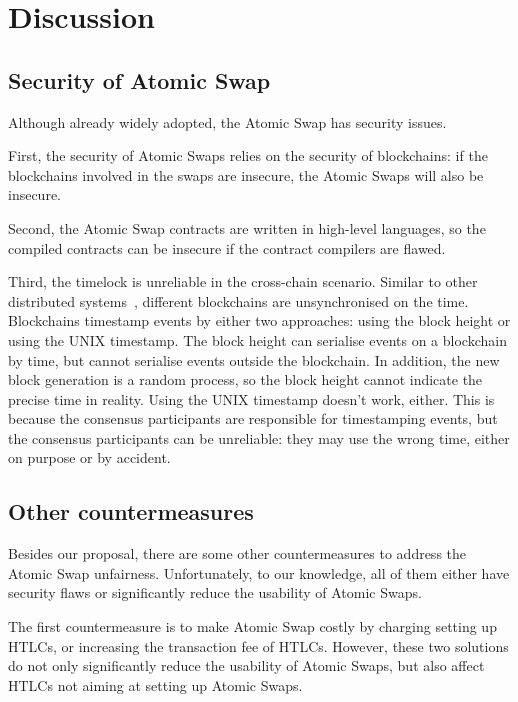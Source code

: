 \section{Discussion}
\label{sec:discussion}

\subsection{Security of Atomic Swap}

Although already widely adopted, the Atomic Swap has security issues.

First, the security of Atomic Swaps relies on the security of blockchains:
if the blockchains involved in the swaps are insecure, the Atomic Swaps will also be insecure.

Second, the Atomic Swap contracts are written in high-level languages, so the compiled contracts can be insecure if the contract compilers are flawed.

Third, the timelock is unreliable in the cross-chain scenario.
Similar to other distributed systems~\cite{coulouris2012distributed}, different blockchains are unsynchronised on the time.
Blockchains timestamp events by either two approaches: using the block height or using the UNIX timestamp.
The block height can serialise events on a blockchain by time, but cannot serialise events outside the blockchain.
In addition, the new block generation is a random process, so the block height cannot indicate the precise time in reality.
Using the UNIX timestamp doesn't work, either.
This is because the consensus participants are responsible for timestamping events, but the consensus participants can be unreliable:
they may use the wrong time, either on purpose or by accident.


\subsection{Other countermeasures}

Besides our proposal, there are some other countermeasures to address the Atomic Swap unfairness.
Unfortunately, to our knowledge, all of them either have security flaws or significantly reduce the usability of Atomic Swaps.

The first countermeasure is to make Atomic Swap costly by charging setting up HTLCs, or increasing the transaction fee of HTLCs.
However, these two solutions do not only significantly reduce the usability of Atomic Swaps, but also affect HTLCs not aiming at setting up Atomic Swaps.

